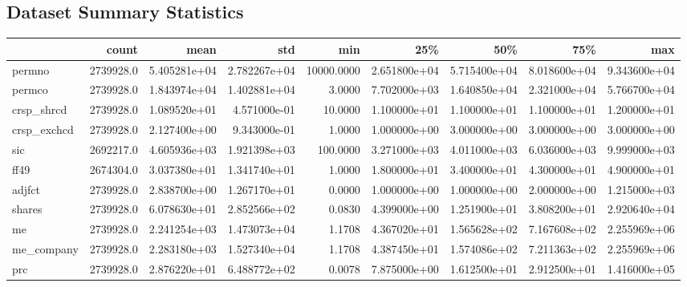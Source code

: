 \documentclass[10pt]{article}
\begin{document}
\begin{landscape}
\subsection{Dataset Summary Statistics}\label{dss}
\setlength{\tabcolsep}{2pt}
\begin{longtable}{|l|r|r|r|r|r|r|r|r|}
\toprule
{} &      count &          mean &           std &         min &           25\% &           50\% &           75\% &           max \\
\midrule
\endhead
permno                  &  2739928.0 &  5.405281e+04 &  2.782267e+04 &  10000.0000 &  2.651800e+04 &  5.715400e+04 &  8.018600e+04 &  9.343600e+04 \\
permco                  &  2739928.0 &  1.843974e+04 &  1.402881e+04 &      3.0000 &  7.702000e+03 &  1.640850e+04 &  2.321000e+04 &  5.766700e+04 \\
crsp\_shrcd              &  2739928.0 &  1.089520e+01 &  4.571000e-01 &     10.0000 &  1.100000e+01 &  1.100000e+01 &  1.100000e+01 &  1.200000e+01 \\
crsp\_exchcd             &  2739928.0 &  2.127400e+00 &  9.343000e-01 &      1.0000 &  1.000000e+00 &  3.000000e+00 &  3.000000e+00 &  3.000000e+00 \\
sic                     &  2692217.0 &  4.605936e+03 &  1.921398e+03 &    100.0000 &  3.271000e+03 &  4.011000e+03 &  6.036000e+03 &  9.999000e+03 \\
ff49                    &  2674304.0 &  3.037380e+01 &  1.341740e+01 &      1.0000 &  1.800000e+01 &  3.400000e+01 &  4.300000e+01 &  4.900000e+01 \\
adjfct                  &  2739928.0 &  2.838700e+00 &  1.267170e+01 &      0.0000 &  1.000000e+00 &  1.000000e+00 &  2.000000e+00 &  1.215000e+03 \\
shares                  &  2739928.0 &  6.078630e+01 &  2.852566e+02 &      0.0830 &  4.399000e+00 &  1.251900e+01 &  3.808200e+01 &  2.920640e+04 \\
me                      &  2739928.0 &  2.241254e+03 &  1.473073e+04 &      1.1708 &  4.367020e+01 &  1.565628e+02 &  7.167608e+02 &  2.255969e+06 \\
me\_company              &  2739928.0 &  2.283180e+03 &  1.527340e+04 &      1.1708 &  4.387450e+01 &  1.574086e+02 &  7.211363e+02 &  2.255969e+06 \\
prc                     &  2739928.0 &  2.876220e+01 &  6.488772e+02 &      0.0078 &  7.875000e+00 &  1.612500e+01 &  2.912500e+01 &  1.416000e+05 \\

\end{longtable}
\end{landscape}
\end{document}
